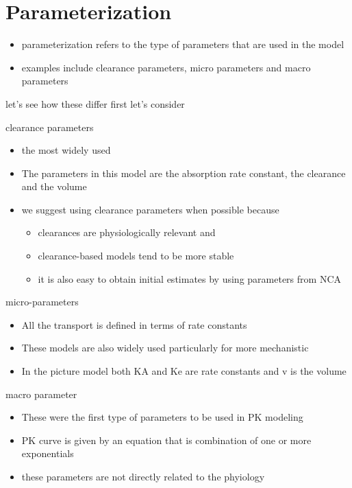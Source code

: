 \documentclass[
  letterpaper,
  DIV=11,
  numbers=noendperiod]{scrreprt}
\providecommand{\tightlist}{%
  \setlength{\itemsep}{0pt}\setlength{\parskip}{0pt}}\usepackage{longtable,booktabs,array}
\begin{document}
\hypertarget{parameterization}{%
\section{Parameterization}\label{parameterization}}

\begin{itemize}
\tightlist
\item
  parameterization refers to the type of parameters that are used in the
  model
\item
  examples include clearance parameters, micro parameters and macro
  parameters
\end{itemize}

let's see how these differ first let's consider

clearance parameters

\begin{itemize}
\tightlist
\item
  the most widely used
\item
  The parameters in this model are the absorption rate constant, the
  clearance and the volume
\item
  we suggest using clearance parameters when possible because

  \begin{itemize}
  \tightlist
  \item
    clearances are physiologically relevant and
  \item
    clearance-based models tend to be more stable
  \item
    it is also easy to obtain initial estimates by using parameters from
    NCA
  \end{itemize}
\end{itemize}

micro-parameters

\begin{itemize}
\tightlist
\item
  All the transport is defined in terms of rate constants
\item
  These models are also widely used particularly for more mechanistic
\item
  In the picture model both KA and Ke are rate constants and v is the
  volume
\end{itemize}

macro parameter

\begin{itemize}
\tightlist
\item
  These were the first type of parameters to be used in PK modeling
\item
  PK curve is given by an equation that is combination of one or more
  exponentials
\item
  these parameters are not directly related to the phyiology
\end{itemize}
\end{document}
